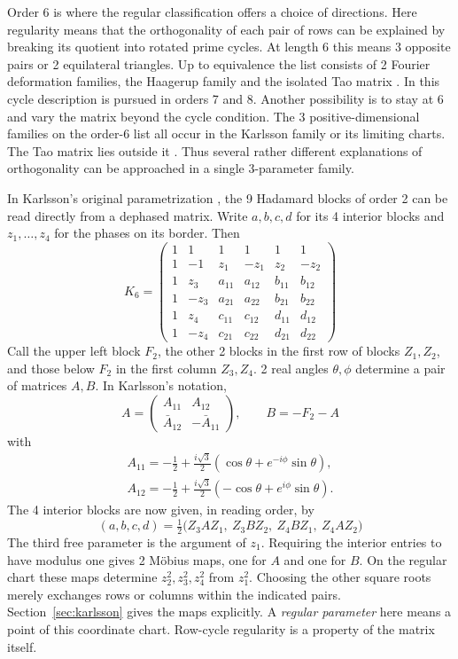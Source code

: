 \documentclass[11pt,a4paper]{amsart}
\begin{document}
Order 6 is where the regular classification offers a choice of directions. Here regularity means that the orthogonality of each pair of rows can be explained by breaking its quotient into rotated prime cycles. At length 6 this means 3 opposite pairs or 2 equilateral triangles. Up to equivalence the list consists of 2 Fourier deformation families, the Haagerup family and the isolated Tao matrix \cite{bbs,gt}. In \cite{gt} this cycle description is pursued in orders 7 and 8. Another possibility is to stay at 6 and vary the matrix beyond the cycle condition. The 3 positive-dimensional families on the order-6 list all occur in the Karlsson family or its limiting charts. The Tao matrix lies outside it \cite{kar,bo}. Thus several rather different explanations of orthogonality can be approached in a single 3-parameter family.

In Karlsson's original parametrization \cite{kar}, the 9 Hadamard blocks of order 2 can be read directly from a dephased matrix. Write $a,b,c,d$ for its 4 interior blocks and $z_1,\ldots,z_4$ for the phases on its border. Then
\[
 K_6=\left(\begin{array}{cc|cc|cc}
 1&1&1&1&1&1\\
 1&-1&z_1&-z_1&z_2&-z_2\\ \hline
 1&z_3&a_{11}&a_{12}&b_{11}&b_{12}\\
 1&-z_3&a_{21}&a_{22}&b_{21}&b_{22}\\ \hline
 1&z_4&c_{11}&c_{12}&d_{11}&d_{12}\\
 1&-z_4&c_{21}&c_{22}&d_{21}&d_{22}
 \end{array}\right)
\]
Call the upper left block $F_2$, the other 2 blocks in the first row of blocks $Z_1,Z_2$, and those below $F_2$ in the first column $Z_3,Z_4$. 2 real angles $\theta,\phi$ determine a pair of matrices $A,B$. In Karlsson's notation,
\[
 A=\begin{pmatrix} A_{11}&A_{12}\\ \bar A_{12}&-\bar A_{11}\end{pmatrix},
 \qquad B=-F_2-A
\]
with
\[
 \begin{gathered}
 A_{11}=-\tfrac12+\tfrac{i\sqrt3}{2}(\cos\theta+e^{-i\phi}\sin\theta),\\
 A_{12}=-\tfrac12+\tfrac{i\sqrt3}{2}(-\cos\theta+e^{i\phi}\sin\theta).
 \end{gathered}
\]
The 4 interior blocks are now given, in reading order, by
\[
 (a,b,c,d)=\tfrac12\big(Z_3AZ_1,\ Z_3BZ_2,\ Z_4BZ_1,\ Z_4AZ_2\big)
\]
The third free parameter is the argument of $z_1$. Requiring the interior entries to have modulus one gives 2 M\"obius maps, one for $A$ and one for $B$. On the regular chart these maps determine $z_2^2,z_3^2,z_4^2$ from $z_1^2$. Choosing the other square roots merely exchanges rows or columns within the indicated pairs. Section~\ref{sec:karlsson} gives the maps explicitly. A \emph{regular parameter} here means a point of this coordinate chart. Row-cycle regularity is a property of the matrix itself.
\end{document}
